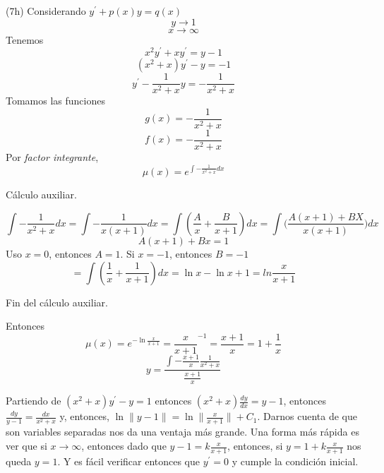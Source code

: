 \begin{exercise}
(7h) Considerando $y^{\prime} + p(x)y = q(x)$
$$y \longrightarrow 1$$
$$x \longrightarrow \infty$$
Tenemos
$$x^{2}y^{\prime} + xy^{\prime} = y - 1$$
$$(x^2 + x)y^{\prime} - y = -1$$
$$y^{\prime} - \frac{1}{x^2 + x}y = - \frac{1}{x^2 + x}$$
Tomamos las funciones
$$g(x) = - \frac{1}{x^2 + x}$$
$$f(x) = - \frac{1}{x^2 + x}$$
Por \emph{factor integrante},
$$\mu(x) = e ^{\int{- \frac{1}{x^2 + x}dx}}$$

C\'alculo auxiliar.

$$
{\int{- \frac{1}{x^2 + x}dx}} = 
{\int{- \frac{1}{x(x + 1)}dx}} =
{\int{(\frac{A}{x} + \frac{B}{x+1})dx}} =
{\int{(\frac{A(x+1) + BX}{x(x+1)}})dx}
$$
$$
A(x+1) + Bx = 1 
$$
Uso $x = 0$, entonces $A = 1$. Si $x = -1$, entonces $B = -1$
$$
={\int{(\frac{1}{x} + \frac{1}{x+1})dx}}
=\ln{x}-\ln{x+1}=ln{\frac{x}{x+1}}
$$

Fin del c\'alculo auxiliar.

Entonces
$$
\mu(x)=e^{-\ln{\frac{x}{x+1}}} = \frac{x}{x+1}^{-1} = \frac{x+1}{x} = 1 + \frac{1}{x}
$$
$$
y = \frac{\int{-\frac{x+1}{x} \frac{1}{x^2 + x}}}{\frac{x+1}{x}}
$$

Partiendo de $(x^2 + x)y^{\prime} - y = 1$ entonces $(x^2 + x)\frac{dy}{dx} = y - 1$, entonces $\frac{dy}{y-1} = \frac{dx}{x^2 + x}$ y, entonces, $\ln{\|y-1\|} = \ln{\|\frac{x}{x+1}\|} + C_1$. Darnos cuenta de que son variables separadas nos da una ventaja m\'as grande. Una forma m\'as r\'apida es ver que si $x\longrightarrow \infty$, entonces dado que $y - 1 = k\frac{x}{x+1}$, entonces, si $y = 1 + k\frac{x}{x+1}$ nos queda $y = 1$. Y es f\'acil verificar entonces que $y^{\prime} = 0$ y cumple la condici\'on inicial.


\end{exercise}